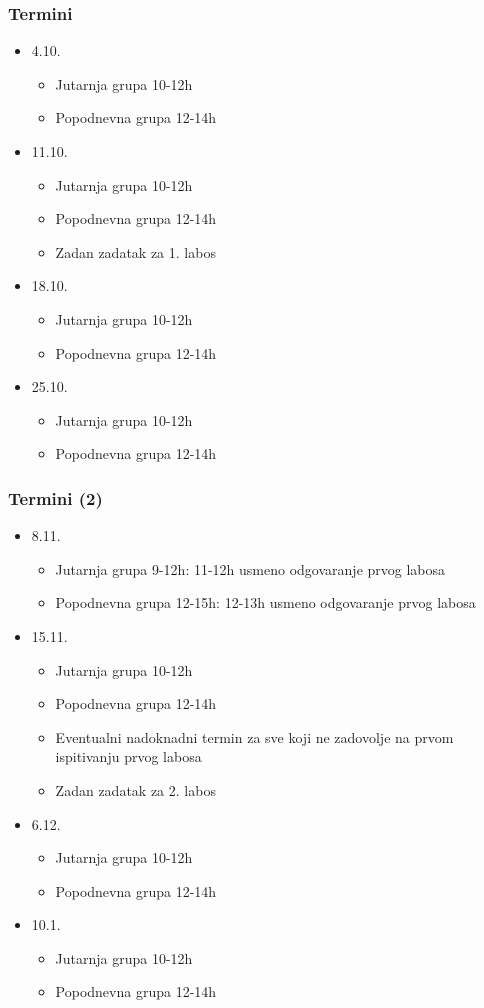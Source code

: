 \documentclass{beamer}
\begin{document}
\begin{frame}[t]
\frametitle{Termini}
\begin{itemize}
	\item 4.10.
	\begin{itemize}
		\item Jutarnja grupa 10-12h
		\item Popodnevna grupa 12-14h
	\end{itemize}
	\item 11.10.
	\begin{itemize}
		\item Jutarnja grupa 10-12h
		\item Popodnevna grupa 12-14h
		\item Zadan zadatak za 1. labos
	\end{itemize}
	\item 18.10.
	\begin{itemize}
		\item Jutarnja grupa 10-12h
		\item Popodnevna grupa 12-14h
	\end{itemize}
	\item 25.10.
	\begin{itemize}
		\item Jutarnja grupa 10-12h
		\item Popodnevna grupa 12-14h
	\end{itemize}
\end{itemize}
\end{frame}

\begin{frame}[t]
\frametitle{Termini (2)}
\begin{itemize}
	\item 8.11.
	\begin{itemize}
		\item Jutarnja grupa 9-12h: 11-12h usmeno odgovaranje prvog labosa
		\item Popodnevna grupa 12-15h: 12-13h usmeno odgovaranje prvog labosa
	\end{itemize}
	\item 15.11.
	\begin{itemize}
		\item Jutarnja grupa 10-12h
		\item Popodnevna grupa 12-14h
		\item Eventualni nadoknadni termin za sve koji ne zadovolje na prvom ispitivanju prvog labosa
		\item Zadan zadatak za 2. labos
	\end{itemize}
	\item 6.12.
	\begin{itemize}
		\item Jutarnja grupa 10-12h
		\item Popodnevna grupa 12-14h
	\end{itemize}
	\item 10.1.
	\begin{itemize}
		\item Jutarnja grupa 10-12h
		\item Popodnevna grupa 12-14h
	\end{itemize}
\end{itemize}
\end{frame}
\end{document}
